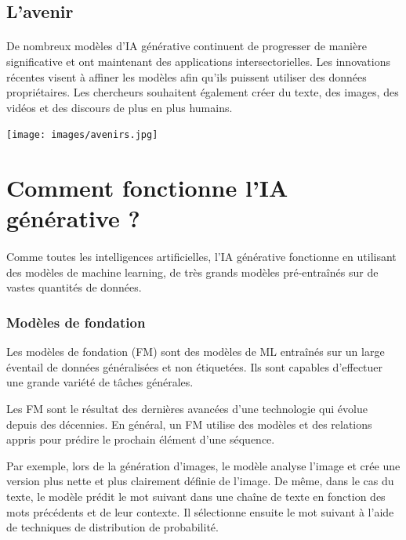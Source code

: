 \subsection{L’avenir}
\begin{center}
	\begin{minipage}{0.5\textwidth}
		\paragraph{}
		De nombreux modèles d'IA générative continuent de progresser de manière
		significative et ont maintenant des applications intersectorielles. Les innovations
		récentes visent à affiner les modèles afin qu'ils puissent utiliser des données
		propriétaires. Les chercheurs souhaitent également créer du texte, des images,
		des vidéos et des discours de plus en plus humains.
	\end{minipage}%
	\hfill
	\begin{minipage}{0.4\textwidth}
		\centering
		\texttt{[image: images/avenirs.jpg]}
	\end{minipage}
\end{center}

\section{Comment fonctionne l'IA générative ?}
\paragraph{}
Comme toutes les intelligences artificielles, l’IA générative fonctionne en
utilisant des modèles de machine learning, de très grands modèles pré-entraînés sur
de vastes quantités de données.

\subsubsection*{Modèles de fondation}
Les modèles de fondation (FM) sont des modèles de ML entraînés sur un large éventail
de données généralisées et non étiquetées. Ils sont capables d’effectuer une
grande variété de tâches générales.

Les FM sont le résultat des dernières avancées d'une technologie qui évolue
depuis des décennies. En général, un FM utilise des modèles et des relations
appris pour prédire le prochain élément d'une séquence.

Par exemple, lors de la génération d'images, le modèle analyse l'image et crée
une version plus nette et plus clairement définie de l'image. De même, dans le
cas du texte, le modèle prédit le mot suivant dans une chaîne de texte en fonction
des mots précédents et de leur contexte. Il sélectionne ensuite le mot suivant à
l'aide de techniques de distribution de probabilité.

